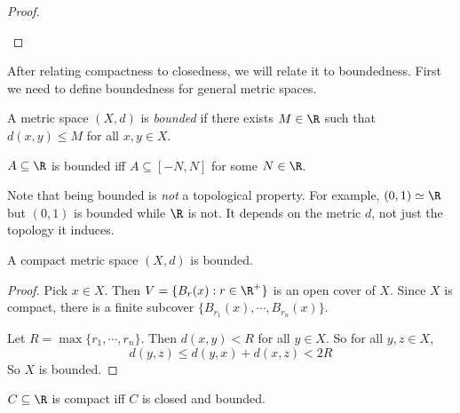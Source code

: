 \documentclass[a4paper]{article}
\begin{document}
\begin{proof}
\begin{center}
  \end{center}
\end{proof}

After relating compactness to closedness, we will relate it to boundedness. First we need to define boundedness for general metric spaces.
\begin{defi}
  A metric space $(X, d)$ is \emph{bounded} if there exists $M\in \R$ such that $d(x, y) \leq M$ for all $x, y\in X$.
\end{defi}

\begin{eg}
  $A\subseteq \R$ is bounded iff $A\subseteq [-N, N]$ for some $N\in \R$.
\end{eg}
Note that being bounded is \emph{not} a topological property. For example, $(0, 1)\simeq \R$ but $(0, 1)$ is bounded while $\R$ is not. It depends on the metric $d$, not just the topology it induces.

\begin{prop}
  A compact metric space $(X, d)$ is bounded.
\end{prop}

\begin{proof}
  Pick $x\in X$. Then $V = \{B_r(x): r\in \R^+\}$ is an open cover of $X$. Since $X$ is compact, there is a finite subcover $\{B_{r_1}(x), \cdots, B_{r_n}(x)\}$.

  Let $R = \max\{r_1, \cdots, r_n\}$. Then $d(x, y) < R$ for all $y\in X$. So for all $y, z\in X$,
  \[
    d(y, z) \leq d(y, x) + d(x, z) < 2R
  \]
  So $X$ is bounded.
\end{proof}

\begin{thm}
  $C\subseteq \R$ is compact iff $C$ is closed and bounded.
\end{thm}
\end{document}
